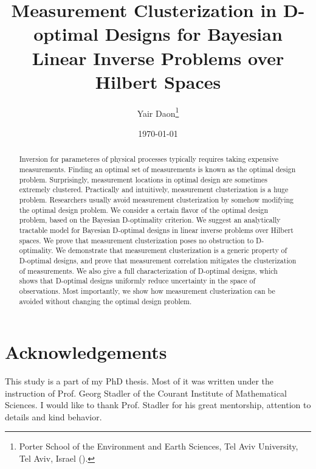 \documentclass{siamonline220329}
\title{Measurement Clusterization in D-optimal Designs for Bayesian Linear
  Inverse Problems over Hilbert Spaces}
\author{Yair Daon\thanks{Porter School of the Environment and Earth
    Sciences, Tel Aviv University, Tel Aviv, Israel
    (\email{yair.daon@gmail.com}).}}
\date{\today}
\begin{document}
\maketitle
\begin{abstract}
  Inversion for parameteres of physical processes typically requires
  taking expensive measurements. Finding an optimal set of
  measurements is known as the optimal design problem. Surprisingly,
  measurement locations in optimal design are sometimes extremely
  clustered. Practically and intuitively, measurement clusterization
  is a huge problem. Researchers usually avoid measurement
  clusterization by somehow modifying the optimal design problem. We
  consider a certain flavor of the optimal design problem, based on
  the Bayesian D-optimality criterion. We suggest an analytically
  tractable model for Bayesian D-optimal designs in linear inverse
  problems over Hilbert spaces. We prove that measurement
  clusterization poses no obstruction to D-optimality. We demonstrate
  that measurement clusterization is a generic property of D-optimal
  designs, and prove that measurement correlation mitigates the
  clusterization of measurements. We also give a full characterization
  of D-optimal designs, which shows that D-optimal designs uniformly
  reduce uncertainty in the space of observations. Most importantly,
  we show how measurement clusterization can be avoided without
  changing the optimal design problem.
\end{abstract}




\maketitle










\section{Acknowledgements}
This study is a part of my PhD thesis. Most of it was written under
the instruction of Prof. Georg Stadler of the Courant Institute of
Mathematical Sciences. I would like to thank Prof. Stadler for his
great mentorship, attention to details and kind behavior.
\end{document}
